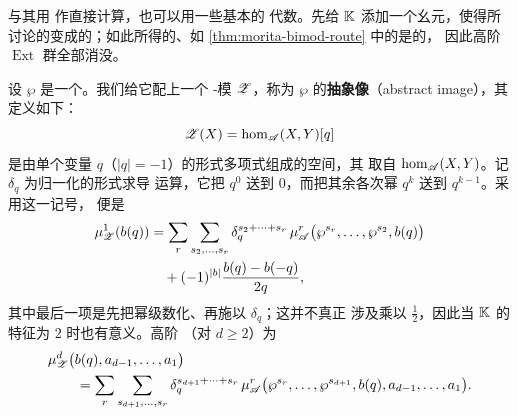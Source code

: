\begin{remark}\label{thm:homotopy-idempotent-ext}
与其用 \trHochschild{}\trComplex{}作直接计算，也可以用一些基本的%
\trHomology{}代数。先给 $\mathbb{K}$
添加一个幺元，使得所讨论的\trFunctor{}变成\trUnital{}的；如此所得的、如%
\cref{thm:morita-bimod-route} 中的\trBimodule{}\trCategory{}是\trSemisimple{}的，
因此高阶 $\operatorname{Ext}$ 群全部消没。
\end{remark}

设 $\wp$ 是一个\trHomotopy\trIdempotent。我们给它配上一个 \trAinfty-模
$\mathscr{Z}$，称为 $\wp$ 的\textbf{抽象像}（abstract image），其定义如下：
\begin{equation*}
\mathscr{Z}(X)=\hom_{\mathscr{A}}(X,Y)[q]
\end{equation*}
是由单个\trGraded{}变量 $q$（$|q|=-1$）的形式多项式组成的空间，其%
\trCoefficients{}取自 $\hom_{\mathscr{A}}(X,Y)$。记 $\delta_q$ 为归一化的形式求导
运算，它把 $q^0$ 送到 $0$，而把其余各次幂 $q^k$ 送到 $q^{k-1}$。采用这一记号，
\trDifferential{}便是
\begin{equation}\label{eq:abstract-image-differential}
\begin{split}
\mu^1_{\mathscr{Z}}(b(q))
&=\sum_r\sum_{s_2,\ldots,s_r}\delta_q^{s_2+\cdots+s_r}\,
\mu^r_{\mathscr{A}}\bigl(\wp^{s_r},\ldots,\wp^{s_2},b(q)\bigr)\\
&\quad+(-1)^{|b|}\frac{b(q)-b(-q)}{2q},
\end{split}
\end{equation}
其中最后一项是先把幂级数\trAntisymmetric{}化、再施以 $\delta_q$；这并不真正
涉及乘以 $\frac{1}{2}$，因此当 $\mathbb{K}$ 的特征为 $2$ 时也有意义。高阶%
\trStructureMap{}（对 $d\ge 2$）为
\begin{equation*}
\begin{split}
&\mu^d_{\mathscr{Z}}\bigl(b(q),a_{d-1},\ldots,a_1\bigr)\\
&\qquad=\sum_r\sum_{s_{d+1},\ldots,s_r}\delta_q^{s_{d+1}+\cdots+s_r}\,
\mu^r_{\mathscr{A}}\bigl(\wp^{s_r},\ldots,\wp^{s_{d+1}},b(q),a_{d-1},\ldots,a_1\bigr).
\end{split}
\end{equation*}

